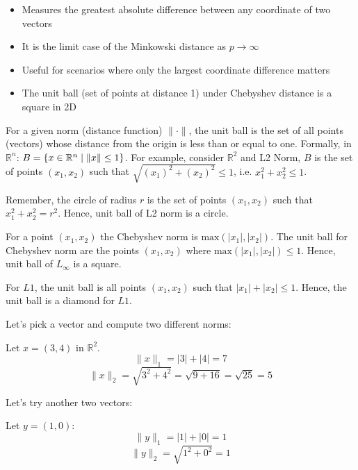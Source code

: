 \documentclass{article}
\begin{document}


\begin{itemize}
    \item Measures the greatest absolute difference between any coordinate of two vectors
    \item It is the limit case of the Minkowski distance as $p \to \infty$
    \item Useful for scenarios where only the largest coordinate difference matters
    \item The unit ball (set of points at distance 1) under Chebyshev distance is a square in 2D
\end{itemize}

For a given norm (distance function) $\|\cdot\|$, the unit ball is the set of all points (vectors) whose distance from the origin is less than or equal to one. Formally, in $\mathbb{R}^n$: $B = \{x \in \mathbb{R}^n \mid \|x\| \leq 1\}$. For example, consider $\mathbb{R}^2$ and L2 Norm, $B$ is the set of points $(x_1,x_2)$ such that $\sqrt{(x_1)^2 + (x_2)^2} \leq 1$, i.e. $x_1^2 + x_2^2 \leq 1$.

Remember, the circle of radius $r$ is the set of points $(x_1,x_2)$ such that $x_1^2 + x_2^2 = r^2$. Hence, unit ball of L2 norm is a circle.

For a point $(x_1,x_2)$ the Chebyshev norm is $\text{max}(|x_1|,|x_2|)$. The unit ball for Chebyshev norm are the points $(x_1,x_2)$ where $\text{max}(|x_1|,|x_2|) \leq 1$. Hence, unit ball of $L_{\infty}$ is a square.

For $L1$, the unit ball is all points $(x_1, x_2)$ such that $|x_1| + |x_2| \leq 1$. Hence, the unit ball is a diamond for $L1$.


Let's pick a vector and compute two different norms:

Let $x = (3, 4)$ in $\mathbb{R}^2$.
\[
\|x\|_1 = |3| + |4| = 7
\]
\[
\|x\|_2 = \sqrt{3^2 + 4^2} = \sqrt{9 + 16} = \sqrt{25} = 5
\]

Let's try another two vectors:

Let $y = (1, 0)$:
\[
\|y\|_1 = |1| + |0| = 1
\]
\[
\|y\|_2 = \sqrt{1^2 + 0^2} = 1
\]
\end{document}
